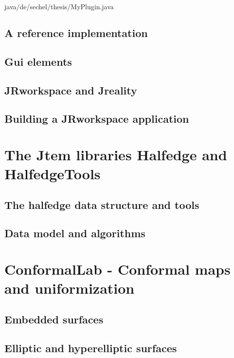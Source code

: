  {java/de/sechel/thesis/MyPlugin.java}


\subsection{A reference implementation}



\subsection{Gui elements}
\subsection{{\sc JRworkspace} and {\sc Jreality}}
\subsection{Building a {\sc JRworkspace} application}

\section{The {\sc Jtem} libraries {\sc Halfedge} and {\sc HalfedgeTools}}
\label{sec:halfedge_halfedgetools}
\subsection{The halfedge data structure and tools}
\subsection{Data model and algorithms}

\section{{\sc ConformalLab} - Conformal maps and uniformization}
\label{sec:conformallab}
\subsection{Embedded surfaces}
\subsection{Elliptic and hyperelliptic surfaces}
